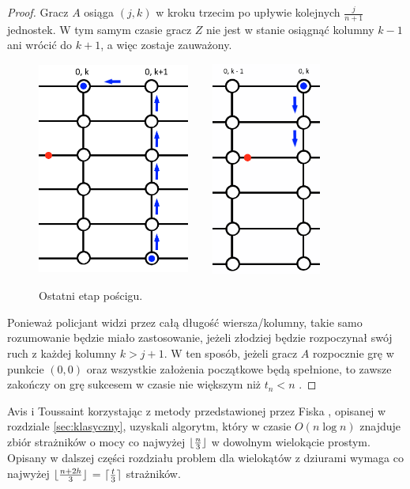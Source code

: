 \documentclass[brudnopis]{xmgr}
\DeclarePairedDelimiter\ceil{\lceil}{\rceil}
\DeclarePairedDelimiter\floor{\lfloor}{\rfloor}
\theoremstyle{definition}
\begin{document}
\begin{proof}
	\indent Gracz $A$ osiąga $(j,k)$ w kroku trzecim po upływie kolejnych $\frac{j}{n+1}$ jednostek. W tym samym czasie gracz $Z$ nie jest w stanie osiągnąć kolumny $k - 1$ ani wrócić do $k + 1$, a więc zostaje zauważony.
	\begin{figure}[ht!]
	  \centering
	  \includegraphics[width=5cm,height=7cm]{rysunki/poscig_4.png}
	  \includegraphics[width=5cm,height=7cm]{rysunki/poscig_5.png}
	  \caption{Ostatni etap pościgu.}
	  \label{fig:ostatni etap poscigu}
    \vspace{5in}
	\end{figure} 

	\indent Ponieważ policjant widzi przez całą długość wiersza/kolumny, takie samo rozumowanie będzie miało zastosowanie, jeżeli złodziej będzie rozpoczynał swój ruch z każdej kolumny $k > j + 1$. W ten sposób, jeżeli gracz $A$ rozpocznie grę w punkcie $(0,0)$ oraz wszystkie założenia początkowe będą spełnione, to zawsze zakończy on grę sukcesem w czasie nie większym niż $t_n < n$ .
\end{proof} 

\summary
Avis i Toussaint \cite{avis} korzystając z metody przedstawionej przez Fiska \cite{fisk}, opisanej w rozdziale \ref{sec:klasyczny}, uzyskali algorytm, który w czasie $O(n \log n)$ znajduje zbiór strażników o mocy co najwyżej $\floor{\frac{n}{3}}$ w dowolnym wielokącie prostym. Opisany w dalszej części rozdziału problem dla wielokątów z dziurami wymaga co najwyżej $\floor{\frac{n+2h}{3}}$ = $\ceil{\frac{t}{3}}$ strażników.
\end{document}
